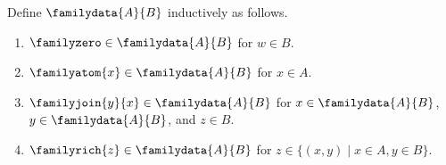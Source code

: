 \begin{datatype}\label{family_data}
    Define $\familydata{A}{B}$ inductively as follows.
    \begin{enumerate}
        \item $\familyzero\in\familydata{A}{B}$ for $w\in B$.
        \item $\familyatom{x}\in\familydata{A}{B}$ for $x\in A$.
        \item $\familyjoin{y}{x}\in\familydata{A}{B}$ for
            $x\in\familydata{A}{B}$, $y\in\familydata{A}{B}$, and $z\in B$.
        \item $\familyrich{z}\in\familydata{A}{B}$ for
            $z\in\{(x,y)\mid x\in A,y\in B\}$.
    \end{enumerate}
\end{datatype}
